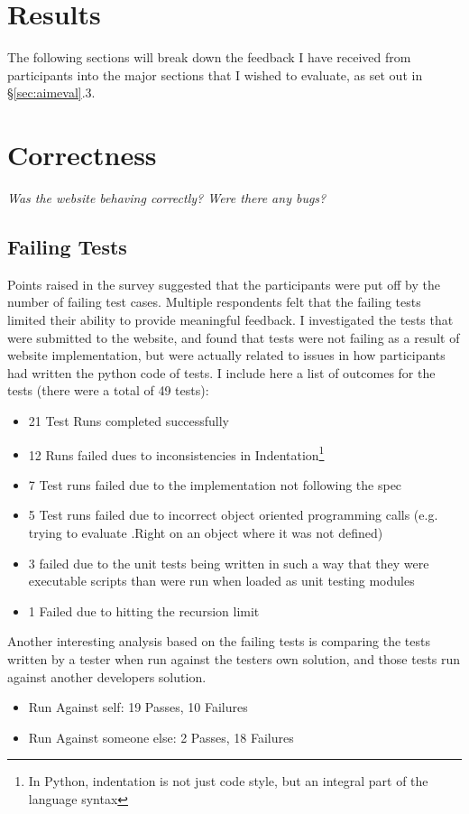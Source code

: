 \documentclass[a4paper,11pt]{report}
\begin{document}
\section*{Results}
The following sections will break down the feedback I have received from participants into the major sections that I wished to evaluate, as set out in \S\ref{sec:aimeval}.3.

\section{Correctness}
\textit{Was the website behaving correctly? Were there any bugs?}\par
\subsection{Failing Tests}
Points raised in the survey suggested that the participants were put off by the number of failing test cases.  Multiple respondents felt that the failing tests limited  their ability to provide meaningful feedback. I investigated the tests that were submitted to the website, and found that tests were not failing as a result of website implementation, but were actually related to issues in how participants had written the python code of tests. I include here a list of outcomes for the tests (there were a total of 49 tests):
\begin{itemize}
\item 21 Test Runs completed successfully
\item 12 Runs failed dues to inconsistencies in Indentation\footnote{In Python, indentation is not just code style, but an integral part of the language syntax}
\item 7 Test runs failed due to the implementation not following the spec
\item 5 Test runs failed due to incorrect object oriented programming calls (e.g. trying to evaluate .Right on an object where it was not defined)
\item 3 failed due to the unit tests being written in such a way that they were executable scripts than were run when loaded as unit testing modules
\item 1 Failed due to hitting the recursion limit
\end{itemize}
Another interesting analysis based on the failing tests is comparing the tests written by a tester when run against the testers own solution, and those tests run against another developers solution.
\begin{itemize}
\item Run Against self: 19 Passes, 10 Failures
\item Run Against someone else: 2 Passes, 18 Failures
\end{itemize}
\end{document}
